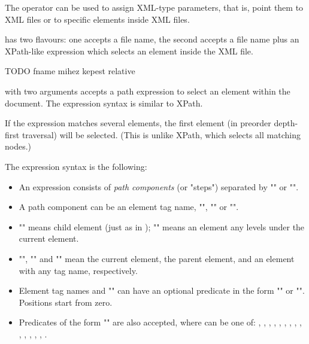 The  operator can be used to assign XML-type parameters,
that is, point them to XML files or to specific elements inside XML files.

 has two flavours: one accepts a file name, the second accepts
a file name plus an XPath-like expression which selects an element
inside the XML file.

TODO fname mihez kepest relative

 with two arguments accepts a path expression
to select an element within the document. The expression syntax is
similar to XPath.

If the expression matches several elements, the first element
(in preorder depth-first traversal) will be selected. (This is
unlike XPath, which selects all matching nodes.)

The expression syntax is the following:
\begin{itemize}
  \item An expression consists of \textit{path components} (or "steps")
        separated by "\ttt{/}" or "\ttt{//}".
  \item A path component can be an element tag name, "\ttt{*}", ""
        or "".
  \item "\ttt{/}" means child element (just as in );
        "\ttt{//}" means an element any levels under the current element.
  \item "", "" and "\ttt{*}" mean the current element,
        the parent element, and an element with any tag name, respectively.
  \item Element tag names and "\ttt{*}" can have an optional predicate
        in the form "\ttt{[position]}" or "\ttt{[@attribute='value']}".
        Positions start from zero.
  \item Predicates of the form "\ttt{[@attribute=\textit{\$param}]}" are also
        accepted, where  can be one of:
        ,
        ,
        ,
        ,
        ,
        ,
        ,
        ,
        ,
        ,
        ,
        ,
        ,
        ,
        .
\end{itemize}

